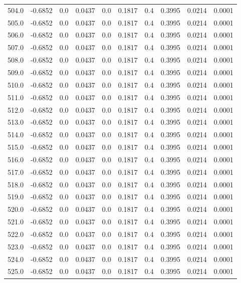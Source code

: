 \begin{longtable}{lrrrrrrrrr}
504.0 & -0.6852 & 0.0 & 0.0437 & 0.0 & 0.1817 & 0.4 & 0.3995 & 0.0214 & 0.0001 \\
505.0 & -0.6852 & 0.0 & 0.0437 & 0.0 & 0.1817 & 0.4 & 0.3995 & 0.0214 & 0.0001 \\
506.0 & -0.6852 & 0.0 & 0.0437 & 0.0 & 0.1817 & 0.4 & 0.3995 & 0.0214 & 0.0001 \\
507.0 & -0.6852 & 0.0 & 0.0437 & 0.0 & 0.1817 & 0.4 & 0.3995 & 0.0214 & 0.0001 \\
508.0 & -0.6852 & 0.0 & 0.0437 & 0.0 & 0.1817 & 0.4 & 0.3995 & 0.0214 & 0.0001 \\
509.0 & -0.6852 & 0.0 & 0.0437 & 0.0 & 0.1817 & 0.4 & 0.3995 & 0.0214 & 0.0001 \\
510.0 & -0.6852 & 0.0 & 0.0437 & 0.0 & 0.1817 & 0.4 & 0.3995 & 0.0214 & 0.0001 \\
511.0 & -0.6852 & 0.0 & 0.0437 & 0.0 & 0.1817 & 0.4 & 0.3995 & 0.0214 & 0.0001 \\
512.0 & -0.6852 & 0.0 & 0.0437 & 0.0 & 0.1817 & 0.4 & 0.3995 & 0.0214 & 0.0001 \\
513.0 & -0.6852 & 0.0 & 0.0437 & 0.0 & 0.1817 & 0.4 & 0.3995 & 0.0214 & 0.0001 \\
514.0 & -0.6852 & 0.0 & 0.0437 & 0.0 & 0.1817 & 0.4 & 0.3995 & 0.0214 & 0.0001 \\
515.0 & -0.6852 & 0.0 & 0.0437 & 0.0 & 0.1817 & 0.4 & 0.3995 & 0.0214 & 0.0001 \\
516.0 & -0.6852 & 0.0 & 0.0437 & 0.0 & 0.1817 & 0.4 & 0.3995 & 0.0214 & 0.0001 \\
517.0 & -0.6852 & 0.0 & 0.0437 & 0.0 & 0.1817 & 0.4 & 0.3995 & 0.0214 & 0.0001 \\
518.0 & -0.6852 & 0.0 & 0.0437 & 0.0 & 0.1817 & 0.4 & 0.3995 & 0.0214 & 0.0001 \\
519.0 & -0.6852 & 0.0 & 0.0437 & 0.0 & 0.1817 & 0.4 & 0.3995 & 0.0214 & 0.0001 \\
520.0 & -0.6852 & 0.0 & 0.0437 & 0.0 & 0.1817 & 0.4 & 0.3995 & 0.0214 & 0.0001 \\
521.0 & -0.6852 & 0.0 & 0.0437 & 0.0 & 0.1817 & 0.4 & 0.3995 & 0.0214 & 0.0001 \\
522.0 & -0.6852 & 0.0 & 0.0437 & 0.0 & 0.1817 & 0.4 & 0.3995 & 0.0214 & 0.0001 \\
523.0 & -0.6852 & 0.0 & 0.0437 & 0.0 & 0.1817 & 0.4 & 0.3995 & 0.0214 & 0.0001 \\
524.0 & -0.6852 & 0.0 & 0.0437 & 0.0 & 0.1817 & 0.4 & 0.3995 & 0.0214 & 0.0001 \\
525.0 & -0.6852 & 0.0 & 0.0437 & 0.0 & 0.1817 & 0.4 & 0.3995 & 0.0214 & 0.0001 \\

\end{longtable}
